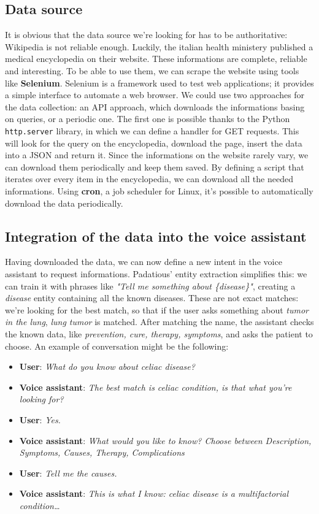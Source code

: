 \documentclass[conference]{IEEEtran}
\begin{document}
\subsection{Data source}
It is obvious that the data source we're looking for has to be authoritative: Wikipedia is not reliable enough. Luckily, the italian health ministery published a medical encyclopedia on their website. These informations are complete, reliable and interesting. To be able to use them, we can scrape the website using tools like \textbf{Selenium}. Selenium is a framework used to test web applications; it provides a simple interface to automate a web browser\cite{selenium}. We could use two approaches for the data collection: an API approach, which downloads the informations basing on queries, or a periodic one. The first one is possible thanks to the Python \texttt{http.server} library, in which we can define a handler for GET requests. This will look for the query on the encyclopedia, download the page, insert the data into a JSON and return it. Since the informations on the website rarely vary, we can download them periodically and keep them saved. By defining a script that iterates over every item in the encyclopedia, we can download all the needed informations. Using \textbf{cron}, a job scheduler for Linux, it's possible to automatically download the data periodically.
\subsection{Integration of the data into the voice assistant}
Having downloaded the data, we can now define a new intent in the voice assistant to request informations. Padatious' entity extraction simplifies this: we can train it with phrases like \textit{"Tell me something about \{disease\}"}, creating a \textit{disease} entity containing all the known diseases. These are not exact matches: we're looking for the best match, so that if the user asks something about \textit{tumor in the lung}, \textit{lung tumor} is matched. After matching the name, the assistant checks the known data, like \textit{prevention, cure, therapy, symptoms}, and asks the patient to choose.
An example of conversation might be the following:
\begin{itemize}
    \item \textbf{User}: \textit{What do you know about celiac disease?}
    \item \textbf{Voice assistant}: \textit{The best match is celiac condition, is that what you're looking for?}
    \item \textbf{User}: \textit{Yes.}
    \item \textbf{Voice assistant}: \textit{What would you like to know? Choose between Description, Symptoms, Causes, Therapy, Complications}
    \item \textbf{User}: \textit{Tell me the causes.}
    \item \textbf{Voice assistant}: \textit{This is what I know: celiac disease is a multifactorial condition\dots}
\end{itemize}
\end{document}

